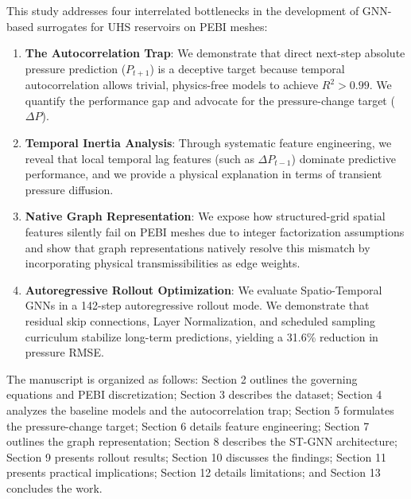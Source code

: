 \documentclass[10pt,twocolumn]{article}
\begin{document}
This study addresses four interrelated bottlenecks in the development of GNN-based surrogates for UHS reservoirs on PEBI meshes:
\begin{enumerate}
    \item \textbf{The Autocorrelation Trap}: We demonstrate that direct next-step absolute pressure prediction ($P_{t+1}$) is a deceptive target because temporal autocorrelation allows trivial, physics-free models to achieve $R^2 > 0.99$. We quantify the performance gap and advocate for the pressure-change target ($\Delta P$).
    \item \textbf{Temporal Inertia Analysis}: Through systematic feature engineering, we reveal that local temporal lag features (such as $\Delta P_{t-1}$) dominate predictive performance, and we provide a physical explanation in terms of transient pressure diffusion.
    \item \textbf{Native Graph Representation}: We expose how structured-grid spatial features silently fail on PEBI meshes due to integer factorization assumptions and show that graph representations natively resolve this mismatch by incorporating physical transmissibilities as edge weights.
    \item \textbf{Autoregressive Rollout Optimization}: We evaluate Spatio-Temporal GNNs in a 142-step autoregressive rollout mode. We demonstrate that residual skip connections, Layer Normalization, and scheduled sampling curriculum stabilize long-term predictions, yielding a 31.6\% reduction in pressure RMSE.
\end{enumerate}
The manuscript is organized as follows: Section 2 outlines the governing equations and PEBI discretization; Section 3 describes the dataset; Section 4 analyzes the baseline models and the autocorrelation trap; Section 5 formulates the pressure-change target; Section 6 details feature engineering; Section 7 outlines the graph representation; Section 8 describes the ST-GNN architecture; Section 9 presents rollout results; Section 10 discusses the findings; Section 11 presents practical implications; Section 12 details limitations; and Section 13 concludes the work.

\end{document}
